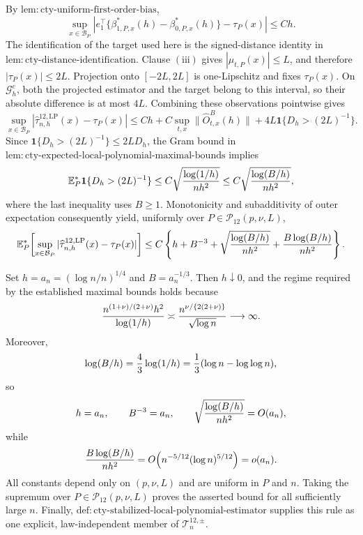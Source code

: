 By \(\mathrm{lem:cty\text{-}uniform\text{-}first\text{-}order\text{-}bias}\),
\[
 \sup_{x\in\mathcal B_P}\left|
 e_1^\top\{\beta^*_{1,P,x}(h)-\beta^*_{0,P,x}(h)\}-\tau_P(x)
 \right|\leq Ch.
\]
The identification of the target used here is the signed-distance identity in \(\mathrm{lem:cty\text{-}distance\text{-}identification}\).  Clause \(\mathrm{(iii)}\) gives \(|\mu_{t,P}(x)|\leq L\), and therefore \(|\tau_P(x)|\leq2L\).  Projection onto \([-2L,2L]\) is one-Lipschitz and fixes \(\tau_P(x)\).  On \(\mathcal G_h^c\), both the projected estimator and the target belong to this interval, so their absolute difference is at most \(4L\).  Combining these observations pointwise gives
\[
 \sup_{x\in\mathcal B_P}
 |\widehat\tau^{12,\mathrm{LP}}_{n,h}(x)-\tau_P(x)|
 \leq Ch+C\sup_{t,x}\lVert\widehat O^B_{t,x}(h)\rVert
 +4L\mathbf1\{D_h>(2L)^{-1}\}.
\]
Since \(\mathbf1\{D_h>(2L)^{-1}\}\leq2LD_h\), the Gram bound in \(\mathrm{lem:cty\text{-}expected\text{-}local\text{-}polynomial\text{-}maximal\text{-}bounds}\) implies
\[
 \mathbb E_P^*\mathbf1\{D_h>(2L)^{-1}\}
 \leq C\sqrt{{\log(1/h)\over nh^2}}
 \leq C\sqrt{{\log(B/h)\over nh^2}},
\]
where the last inequality uses \(B\geq1\).  Monotonicity and subadditivity of outer expectation consequently yield, uniformly over \(P\in\mathcal P_{12}(p,\nu,L)\),
\[
 \mathbb E_P^*\!\left[
 \sup_{x\in\mathcal B_P}
 |\widehat\tau^{12,\mathrm{LP}}_{n,h}(x)-\tau_P(x)|
 \right]
 \leq C\left\{h+B^{-3}+\sqrt{{\log(B/h)\over nh^2}}
 +{B\log(B/h)\over nh^2}\right\}.
\]

Set \(h=a_n=(\log n/n)^{1/4}\) and \(B=a_n^{-1/3}\).  Then \(h\downarrow0\), and the regime required by the established maximal bounds holds because
\[
 {n^{(1+\nu)/(2+\nu)}h^2\over\log(1/h)}
 \asymp {n^{\nu/\{2(2+\nu)\}}\over\sqrt{\log n}}
 \longrightarrow\infty.
\]
Moreover,
\[
 \log(B/h)={4\over3}\log(1/h)
 ={1\over3}(\log n-\log\log n),
\]
so
\[
 h=a_n,\qquad B^{-3}=a_n,
 \qquad \sqrt{{\log(B/h)\over nh^2}}=O(a_n),
\]
while
\[
 {B\log(B/h)\over nh^2}
 =O\!\left(n^{-5/12}(\log n)^{5/12}\right)=o(a_n).
\]
All constants depend only on \((p,\nu,L)\) and are uniform in \(P\) and \(n\).  Taking the supremum over \(P\in\mathcal P_{12}(p,\nu,L)\) proves the asserted bound for all sufficiently large \(n\).  Finally, \(\mathrm{def:cty\text{-}stabilized\text{-}local\text{-}polynomial\text{-}estimator}\) supplies this rule as one explicit, law-independent member of \(\mathcal T_n^{12,\pm}\).